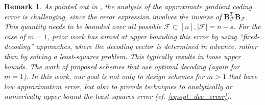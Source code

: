\documentclass[journal,draftcls,onecolumn]{IEEEtran}
\theoremstyle{mystyle}
\newtheorem{remark}{Remark}
\newcommand{\bfB}{\mathbf{B}}
\newcommand{\cF}{\mathcal{F}}
\newcommand{\aditya}[1]{\marginpar{+}{\bf Aditya's remark}: {\em #1}}
\begin{document}
\begin{remark}
\label{remark:opt_vs_fixed}
    As pointed out in \cite{charles2017approximate}, the analysis of the approximate gradient coding error is challenging, since the error expression involves the inverse of $\bfB_{\cF}^T\bfB_{\cF}$. This quantity needs to be bounded over all possible $\cF \subset [n], |\cF| = n-s$. For the case of $m=1$, prior work \cite{dimakis_cyclic_mds} has aimed at upper bounding this error by using ``fixed-decoding'' approaches, where the decoding vector is determined in advance, rather than by solving a least-squares problem. This typically results in loose upper bounds. The work of \cite{glasgowW21} proposed schemes that use optimal decoding (again for $m=1$). In this work, our goal is not only to design schemes for $m > 1$ that have low approximation error, but also to provide techniques to analytically or numerically upper bound the least-squares error ({\it cf.} \eqref{eq:opt_dec_error}). %
\end{remark}





\end{document}
